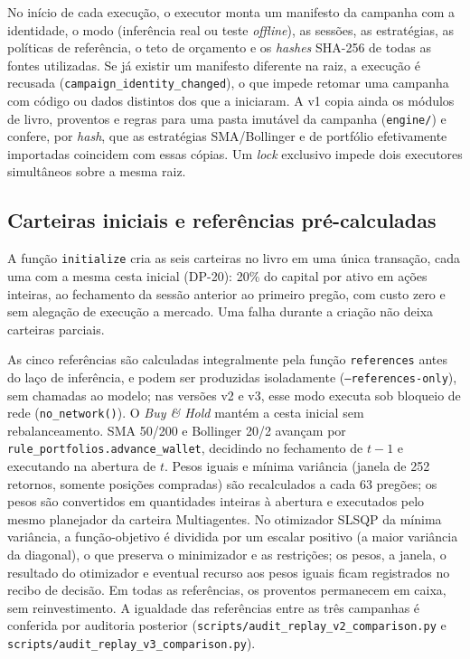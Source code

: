 No início de cada execução, o executor monta um manifesto da campanha com a identidade, o modo (inferência real ou teste \textit{offline}), as sessões, as estratégias, as políticas de referência, o teto de orçamento e os \textit{hashes} SHA-256 de todas as fontes utilizadas. Se já existir um manifesto diferente na raiz, a execução é recusada (\texttt{campaign\_identity\_changed}), o que impede retomar uma campanha com código ou dados distintos dos que a iniciaram. A v1 copia ainda os módulos de livro, proventos e regras para uma pasta imutável da campanha (\texttt{engine/}) e confere, por \textit{hash}, que as estratégias SMA/Bollinger e de portfólio efetivamente importadas coincidem com essas cópias. Um \textit{lock} exclusivo impede dois executores simultâneos sobre a mesma raiz.

\subsection{Carteiras iniciais e referências pré-calculadas}

A função \texttt{initialize} cria as seis carteiras no livro em uma única transação, cada uma com a mesma cesta inicial (DP-20): 20\% do capital por ativo em ações inteiras, ao fechamento da sessão anterior ao primeiro pregão, com custo zero e sem alegação de execução a mercado. Uma falha durante a criação não deixa carteiras parciais.

As cinco referências são calculadas integralmente pela função \texttt{references} antes do laço de inferência, e podem ser produzidas isoladamente (\texttt{--references-only}), sem chamadas ao modelo; nas versões v2 e v3, esse modo executa sob bloqueio de rede (\texttt{no\_network()}). O \textit{Buy \& Hold} mantém a cesta inicial sem rebalanceamento. SMA 50/200 e Bollinger 20/2 avançam por \texttt{rule\_portfolios.advance\_wallet}, decidindo no fechamento de $t-1$ e executando na abertura de $t$. Pesos iguais e mínima variância (janela de 252 retornos, somente posições compradas) são recalculados a cada 63 pregões; os pesos são convertidos em quantidades inteiras à abertura e executados pelo mesmo planejador da carteira Multiagentes. No otimizador SLSQP da mínima variância, a função-objetivo é dividida por um escalar positivo (a maior variância da diagonal), o que preserva o minimizador e as restrições; os pesos, a janela, o resultado do otimizador e eventual recurso aos pesos iguais ficam registrados no recibo de decisão. Em todas as referências, os proventos permanecem em caixa, sem reinvestimento. A igualdade das referências entre as três campanhas é conferida por auditoria posterior (\texttt{scripts/audit\_replay\_v2\_comparison.py} e \texttt{scripts/audit\_replay\_v3\_comparison.py}).

